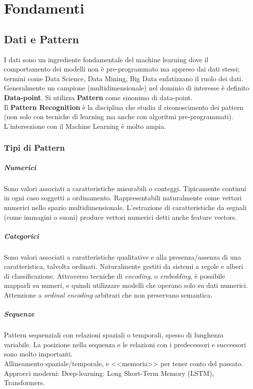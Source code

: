 \chapter{Fondamenti}\label{chap:fondamenti} %
%
\section{Dati e Pattern}\label{sub:dati_e_pattern} %
I dati sono un ingrediente fondamentale del machine learning dove il comportamento dei modelli non è pre-programmato ma appreso dai dati stessi; termini come Data Science, Data Mining, Big Data enfatizzano il ruolo dei dati.
Generalmente un campione (multidimensionale) nel dominio di interesse è definito \textbf{Data-point}.
Si utilizza \textbf{Pattern} come sinonimo di data-point.
\\
Il \textbf{Pattern Recognition} è la disciplina che studia il riconoscimento dei pattern (non solo con tecniche di learning ma anche con algoritmi pre-programmati).
L'intersezione con il Machine Learning è molto ampia.
\subsection{Tipi di Pattern}\label{sec:tipi_di_pattern} %
\paragraph{Numerici}\label{par:numerici} %
Sono valori associati a caratteristiche misurabili o conteggi.
Tipicamente continui in ogni caso soggetti a ordinamento.
Rappresentabili naturalmente come vettori numerici nello spazio multidimensionale.
L'estrazione di caratteristiche da segnali (come immagini o suoni) produce vettori numerici detti anche feature vectors.
\paragraph{Categorici}\label{par:categorici} %
Sono valori associati a caratteristiche qualitative e alla presenza/assenza di una caratteristica, talvolta ordinati.
Naturalmente gestiti da sistemi a regole e alberi di classificazione.
Attraverso tecniche di \textit{encoding}, o \textit{embedding}, è possibile mapparli su numeri, e quindi utilizzare modelli che operano solo su dati numerici.
Attenzione a \textit{ordinal encoding} arbitrari che non preservano semantica.
\paragraph{Sequenze}\label{par:sequenze} %
Pattern sequenziali con relazioni spaziali o temporali, spesso di lunghezza variabile.
La posizione nella sequenza e le relazioni con i predecessori e successori sono molto importanti.
\\
Allineamento spaziale/temporale, e <<memoria>> per tener conto del passato.
\\
Approcci moderni: Deep-learning: Long Short-Term Memory (LSTM), Transformers.
